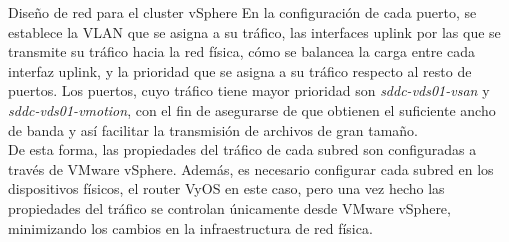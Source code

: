 \begin{subsubsection}{Diseño de red para el cluster vSphere}
  En la configuración de cada puerto, se establece la VLAN que se asigna a su tráfico, las interfaces uplink por las que se transmite su tráfico hacia la red física, cómo se balancea la carga entre cada interfaz uplink, y la prioridad que se asigna a su tráfico respecto al resto de puertos. Los puertos, cuyo tráfico tiene mayor prioridad son \textit{sddc-vds01-vsan} y \textit{sddc-vds01-vmotion}, con el fin de asegurarse de que obtienen el suficiente ancho de banda y así facilitar la transmisión de archivos de gran tamaño. 
\\
  De esta forma, las propiedades del tráfico de cada subred son configuradas a través de VMware vSphere. Además, es necesario configurar cada subred en los dispositivos físicos, el router VyOS en este caso, pero una vez hecho las propiedades del tráfico se controlan únicamente desde VMware vSphere, minimizando los cambios en la infraestructura de red física.
\end{subsubsection}


